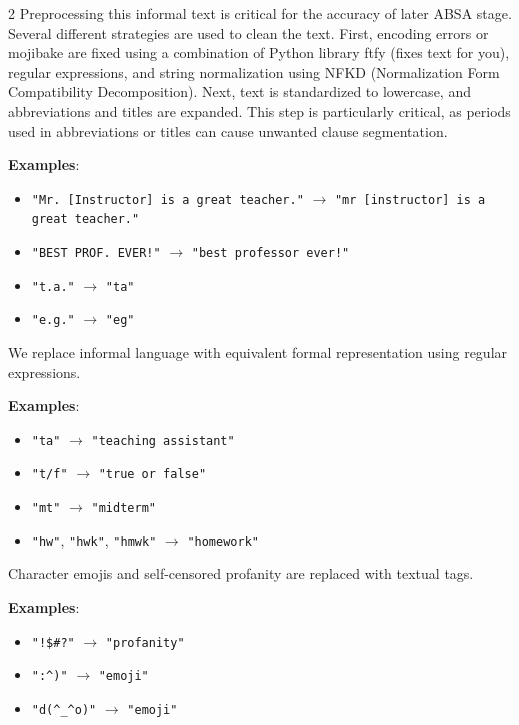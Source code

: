 \documentclass{article}
\begin{document}
\begin{multicols*}{2}
Preprocessing this informal text is critical for the accuracy of later ABSA stage. Several different strategies are used to clean the text. First, encoding errors or mojibake are fixed using a combination of Python library ftfy (fixes text for you), regular expressions, and string normalization using NFKD (Normalization Form Compatibility Decomposition). Next, text is standardized to lowercase, and abbreviations and titles are expanded. This step is particularly critical, as periods used in abbreviations or titles can cause unwanted clause segmentation.\newline

\textbf{Examples}:

\begin{itemize}
    \item \verb|"Mr. [Instructor] is a great teacher."| $\rightarrow$ \verb|"mr [instructor] is a great teacher."|
    \item \verb|"BEST PROF. EVER!"| $\rightarrow$ \verb|"best professor ever!"|
    \item \verb|"t.a."| $\rightarrow$ \verb|"ta"|
    \item \verb|"e.g."| $\rightarrow$ \verb|"eg"|
\end{itemize}

We replace informal language with equivalent formal representation using regular expressions.\newline

\textbf{Examples}: 

\begin{itemize}
    \item \verb|"ta"| $\rightarrow$ \verb|"teaching assistant"|
    \item \verb|"t/f"| $\rightarrow$ \verb|"true or false"|
    \item \verb|"mt"| $\rightarrow$ \verb|"midterm"|
    \item \verb|"hw"|, \verb|"hwk"|, \verb|"hmwk"| $\rightarrow$ \verb|"homework"|
\end{itemize}

Character emojis and self-censored profanity are replaced with textual tags.\newline

\textbf{Examples}:

\begin{itemize}
    \item \verb|"!$#?"| $\rightarrow$ \verb|"profanity"|
    \item \verb|":^)"| $\rightarrow$ \verb|"emoji"|
    \item \verb|"d(^_^o)"| $\rightarrow$ \verb|"emoji"|
\end{itemize}
    

\end{multicols*}
\end{document}
